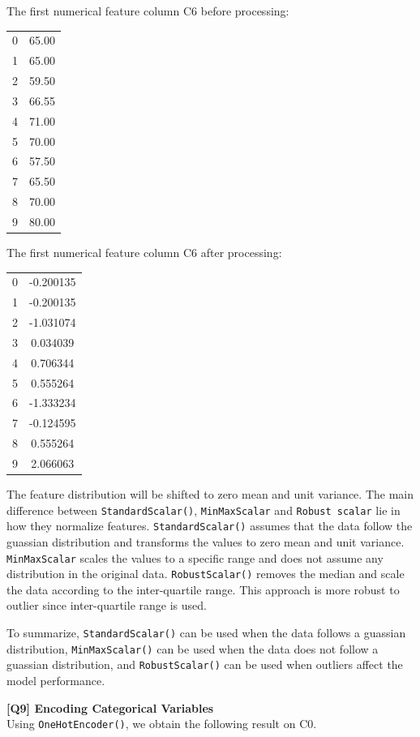 \documentclass{article}
\begin{document}
\begin{description}
	The first numerical feature column C6 before processing:
	\begin{center}
		\begin{tabular}{|c|c|}
			\hline
			0    & 65.00 \\
			1    & 65.00 \\
			2    & 59.50 \\
			3    & 66.55 \\
			4    & 71.00 \\
			5    & 70.00 \\
			6    & 57.50 \\
			7    & 65.50 \\
			8    & 70.00 \\
			9    & 80.00 \\
			\hline
		\end{tabular}
	\end{center}
		The first numerical feature column C6 after processing:
		\begin{center}
			\begin{tabular}{|c|c|}
				\hline
				0   & -0.200135 \\
				1   & -0.200135 \\
				2   & -1.031074 \\
				3   &  0.034039 \\
				4   &  0.706344 \\
				5   &  0.555264 \\
				6   & -1.333234 \\
				7   & -0.124595 \\
				8   &  0.555264 \\
				9   &  2.066063 \\
				\hline
			\end{tabular}
		\end{center}

		The feature distribution will be shifted to zero mean and unit variance. The main difference between \texttt{StandardScalar()}, \texttt{MinMaxScalar} and \texttt{Robust scalar} lie in how they normalize features. \texttt{StandardScalar()} assumes that the data follow the guassian distribution and transforms the values to zero mean and unit variance. \texttt{MinMaxScalar} scales the values to a specific range and does not assume any distribution in the original data. \texttt{RobustScalar()} removes the median and scale the data according to the inter-quartile range. This approach is more robust to outlier since inter-quartile range is used.

		To summarize, \texttt{StandardScalar()} can be used when the data follows a guassian distribution, \texttt{MinMaxScalar()} can be used when the data does not follow a guassian distribution, and \texttt{RobustScalar()} can be used when outliers affect the model performance.
	\item \textbf{[Q9] Encoding Categorical Variables} \\
		Using \texttt{OneHotEncoder()}, we obtain the following result on C0.


\end{description}
\end{document}
